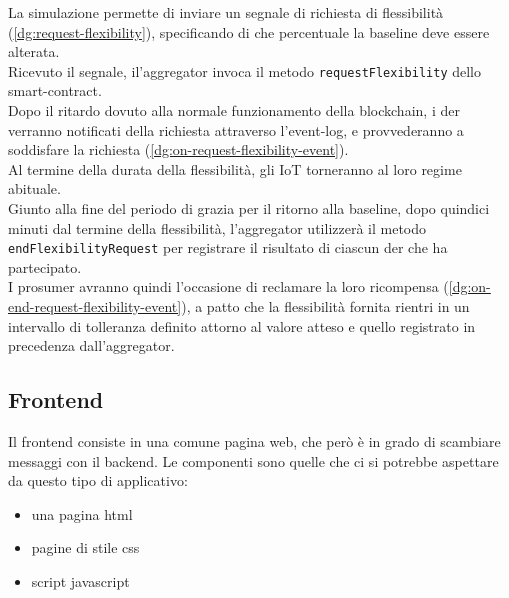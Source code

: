 

La simulazione permette di inviare un segnale di richiesta di flessibilità (\autoref{dg:request-flexibility}), specificando di che percentuale la baseline deve essere alterata. \\
Ricevuto il segnale, il'\gls{aggregator} invoca il metodo \texttt{requestFlexibility} dello \gls{smart-contract}. \\
Dopo il ritardo dovuto alla normale funzionamento della \gls{blockchain},
i \gls{der} verranno notificati della richiesta attraverso l'\gls{event-log},
e provvederanno a soddisfare la richiesta (\autoref{dg:on-request-flexibility-event}). \\
Al termine della durata della flessibilità, gli IoT torneranno al loro regime abituale. \\
Giunto alla fine del periodo di grazia per il ritorno alla baseline, dopo quindici minuti dal termine della flessibilità,
l'\gls{aggregator} utilizzerà il metodo \texttt{endFlexibilityRequest} per registrare il risultato di ciascun \gls{der} che ha partecipato. \\
I \gls{prosumer} avranno quindi l'occasione di reclamare la loro ricompensa (\autoref{dg:on-end-request-flexibility-event}),
a patto che la flessibilità fornita rientri in un intervallo di tolleranza definito attorno al valore atteso e quello registrato in precedenza dall'\gls{aggregator}. \\







\subsection{Frontend}

Il frontend consiste in una comune pagina web, che però è in grado di scambiare messaggi con il backend.
Le componenti sono quelle che ci si potrebbe aspettare da questo tipo di applicativo:

\begin{itemize}
    \item una pagina html
    \item pagine di stile css
    \item script javascript
\end{itemize}

